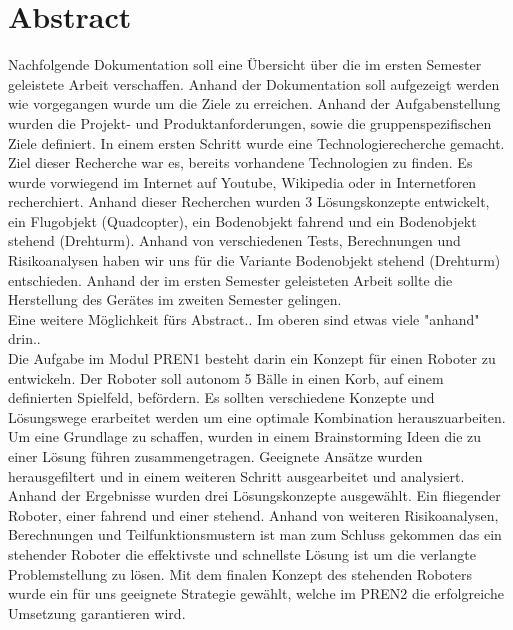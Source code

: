 \section*{Abstract}
Nachfolgende Dokumentation soll eine Übersicht über die im ersten Semester geleistete Arbeit verschaffen. Anhand der Dokumentation soll aufgezeigt werden wie vorgegangen wurde um die Ziele zu erreichen. Anhand der Aufgabenstellung wurden die Projekt- und Produktanforderungen, sowie die gruppenspezifischen Ziele definiert. In einem ersten Schritt wurde eine Technologierecherche gemacht. Ziel dieser Recherche war es, bereits vorhandene Technologien zu finden. Es wurde vorwiegend im Internet auf Youtube, Wikipedia oder in Internetforen recherchiert. Anhand dieser Recherchen wurden 3 Lösungskonzepte entwickelt, ein Flugobjekt (Quadcopter), ein Bodenobjekt fahrend und ein Bodenobjekt stehend (Drehturm). Anhand von verschiedenen Tests, Berechnungen und Risikoanalysen haben wir uns für die Variante Bodenobjekt stehend (Drehturm) entschieden. Anhand der im ersten Semester geleisteten Arbeit sollte die Herstellung des Gerätes im zweiten Semester gelingen.\\
Eine weitere Möglichkeit fürs Abstract.. Im oberen sind etwas viele "{}anhand{}" drin..\\
Die Aufgabe im Modul PREN1 besteht darin ein Konzept für einen Roboter zu entwickeln. Der Roboter soll autonom 5 Bälle in einen Korb, auf einem definierten Spielfeld, befördern. Es sollten verschiedene Konzepte und Lösungswege erarbeitet werden um eine optimale Kombination herauszuarbeiten. Um eine Grundlage zu schaffen, wurden in einem Brainstorming Ideen die zu einer Lösung führen zusammengetragen. Geeignete Ansätze wurden herausgefiltert und in einem weiteren Schritt ausgearbeitet und analysiert. Anhand der Ergebnisse wurden drei Lösungskonzepte ausgewählt. Ein fliegender Roboter, einer fahrend und einer stehend. Anhand von weiteren Risikoanalysen, Berechnungen und Teilfunktionsmustern ist man zum Schluss gekommen das ein stehender Roboter die effektivste und schnellste Lösung ist um die verlangte Problemstellung zu lösen. Mit dem finalen Konzept des stehenden Roboters wurde ein für uns geeignete Strategie gewählt, welche im PREN2 die erfolgreiche Umsetzung garantieren wird.
